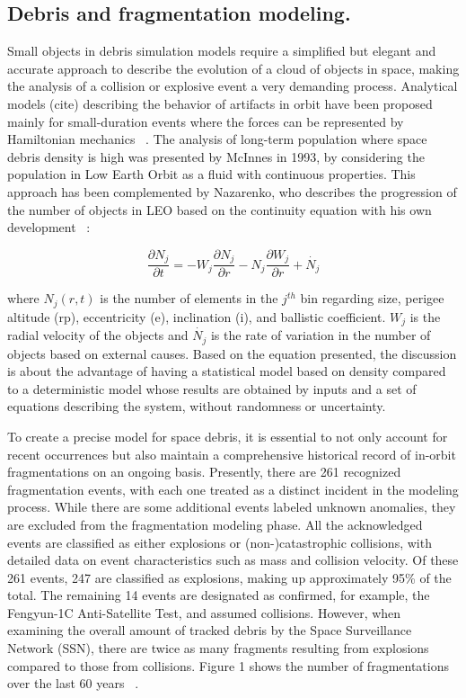 \documentclass[11pt]{article} %
\begin{document}
\subsection{Debris and fragmentation modeling.}

Small objects in debris simulation models require a simplified but elegant and accurate approach to describe the evolution of a cloud of objects in space, making the analysis of a collision or explosive event a very demanding process. Analytical models (cite) describing the behavior of artifacts in orbit have been proposed mainly for small-duration events where the forces can be represented by Hamiltonian mechanics ~\cite{letizia_continuity_2014}. The analysis of long-term population where space debris density is high was presented by McInnes in 1993, by considering the population in Low Earth Orbit as a fluid with continuous properties. This approach has been complemented by Nazarenko, who describes the progression of the number of objects in LEO based on the continuity equation with his own development ~\cite{letizia_multidimensional_2016}:

$$
\frac{\partial N_j}{\partial t}=-W_j\frac{\partial N_j}{\partial r}-N_j\frac{\partial W_j}{\partial r}+\dot{N_j} 
$$

where $N_j(r,t)$ is the number of elements in the $j^{th}$ bin regarding size, perigee altitude (rp), eccentricity (e), inclination (i), and ballistic coefficient. $W_j$ is the radial velocity of the objects and $\dot{N_j}$ is the rate of variation in the number of objects based on external causes. Based on the equation presented, the discussion is about the advantage of having a statistical model based on density compared to a deterministic model whose results are obtained by inputs and a set of equations describing the system, without randomness or uncertainty.

To create a precise model for space debris, it is essential to not only account for recent occurrences but also maintain a comprehensive historical record of in-orbit fragmentations on an ongoing basis. Presently, there are 261 recognized fragmentation events, with each one treated as a distinct incident in the modeling process. While there are some additional events labeled unknown anomalies, they are excluded from the fragmentation modeling phase. All the acknowledged events are classified as either explosions or (non-)catastrophic collisions, with detailed data on event characteristics such as mass and collision velocity. Of these 261 events, 247 are classified as explosions, making up approximately 95\% of the total. The remaining 14 events are designated as confirmed, for example, the Fengyun-1C Anti-Satellite Test, and assumed collisions. However, when examining the overall amount of tracked debris by the Space Surveillance Network (SSN), there are twice as many fragments resulting from explosions compared to those from collisions. Figure 1 shows the number of fragmentations over the last 60 years ~\cite{horstmann_survey_2018}. 
\end{document}
